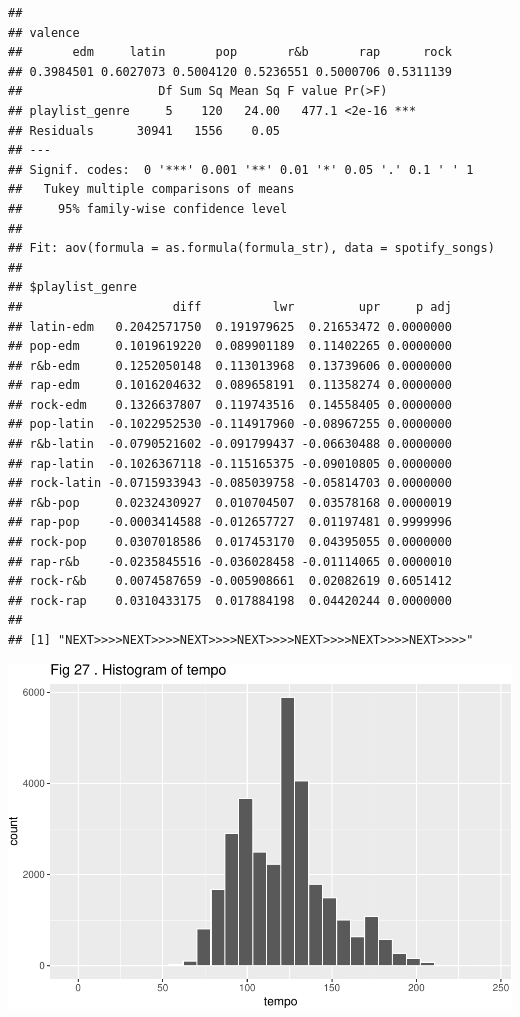 \documentclass[
]{article}
\begin{document}
\begin{verbatim}
## 
## valence
##       edm     latin       pop       r&b       rap      rock 
## 0.3984501 0.6027073 0.5004120 0.5236551 0.5000706 0.5311139 
##                   Df Sum Sq Mean Sq F value Pr(>F)    
## playlist_genre     5    120   24.00   477.1 <2e-16 ***
## Residuals      30941   1556    0.05                   
## ---
## Signif. codes:  0 '***' 0.001 '**' 0.01 '*' 0.05 '.' 0.1 ' ' 1
##   Tukey multiple comparisons of means
##     95% family-wise confidence level
## 
## Fit: aov(formula = as.formula(formula_str), data = spotify_songs)
## 
## $playlist_genre
##                     diff          lwr         upr     p adj
## latin-edm   0.2042571750  0.191979625  0.21653472 0.0000000
## pop-edm     0.1019619220  0.089901189  0.11402265 0.0000000
## r&b-edm     0.1252050148  0.113013968  0.13739606 0.0000000
## rap-edm     0.1016204632  0.089658191  0.11358274 0.0000000
## rock-edm    0.1326637807  0.119743516  0.14558405 0.0000000
## pop-latin  -0.1022952530 -0.114917960 -0.08967255 0.0000000
## r&b-latin  -0.0790521602 -0.091799437 -0.06630488 0.0000000
## rap-latin  -0.1026367118 -0.115165375 -0.09010805 0.0000000
## rock-latin -0.0715933943 -0.085039758 -0.05814703 0.0000000
## r&b-pop     0.0232430927  0.010704507  0.03578168 0.0000019
## rap-pop    -0.0003414588 -0.012657727  0.01197481 0.9999996
## rock-pop    0.0307018586  0.017453170  0.04395055 0.0000000
## rap-r&b    -0.0235845516 -0.036028458 -0.01114065 0.0000010
## rock-r&b    0.0074587659 -0.005908661  0.02082619 0.6051412
## rock-rap    0.0310433175  0.017884198  0.04420244 0.0000000
## 
## [1] "NEXT>>>>NEXT>>>>NEXT>>>>NEXT>>>>NEXT>>>>NEXT>>>>NEXT>>>>"
\end{verbatim}

\includegraphics{Final-Report_files/figure-latex/unnamed-chunk-14-23.pdf}
\end{document}
